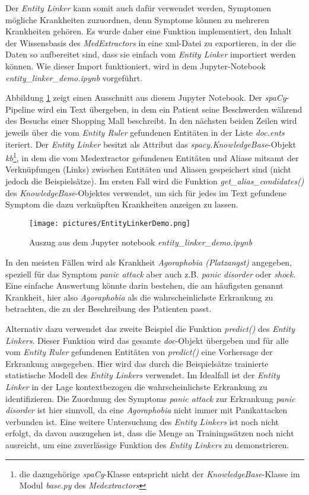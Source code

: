 Der \emph{Entity Linker} kann somit auch dafür verwendet werden, Symptomen mögliche Krankheiten zuzuordnen, denn Symptome können zu mehreren Krankheiten gehören. Es wurde daher eine Funktion implementiert, den Inhalt der Wissensbasis des \emph{MedExtractors} in eine xml-Datei zu exportieren, in der die Daten so aufbereitet sind, dass sie einfach vom \emph{Entity Linker} importiert werden können. Wie dieser Import funktioniert, wird in dem Jupyter-Notebook \emph{entity\_linker\_demo.ipynb} vorgeführt.

Abbildung \ref{fig:jupyter} zeigt einen Ausschnitt aus diesem Jupyter Notebook. Der \emph{spaCy}-Pipeline wird ein Text übergeben, in dem ein Patient seine Beschwerden während des Besuchs einer Shopping Mall beschreibt. In den nächsten beiden Zeilen wird jeweils über die vom \emph{Entity Ruler} gefundenen Entitäten in der Liste \emph{doc.ents} iteriert. Der \emph{Entity Linker} besitzt als Attribut das \emph{spacy.KnowledgeBase}-Objekt \emph{kb}\footnote{die dazugehörige \emph{spaCy}-Klasse entspricht nicht der \emph{KnowledgeBase}-Klasse im Modul \emph{base.py} des \emph{Medextractors}}, in dem die vom Medextractor gefundenen Entitäten und Aliase mitsamt der Verknüpfungen (Links) zwischen Entitäten und Aliasen gespeichert sind (nicht jedoch die Beispielsätze). Im ersten Fall wird die Funktion \emph{get\_alias\_condidates()} des \emph{KnowledgeBase}-Objektes verwendet, um sich für jedes im Text gefundene Symptom die dazu verknüpften Krankheiten anzeigen zu lassen.

\begin{figure}[h]
    \centering
    \texttt{[image: pictures/EntityLinkerDemo.png]}
    \caption{Auszug aus dem Jupyter notebook \emph{entity\_linker\_demo.ipynb}}
    \label{fig:jupyter}
\end{figure}

In den meisten Fällen wird als Krankheit \emph{Agoraphobia (Platzangst)} angegeben, speziell für das Symptom \emph{panic attack} aber auch z.B. \emph{panic disorder} oder \emph{shock}. Eine einfache Auswertung könnte darin bestehen, die am häufigsten genannt Krankheit, hier also \emph{Agoraphobia} als die wahrscheinlichste Erkrankung zu betrachten, die zu der Beschreibung des Patienten passt.

Alternativ dazu verwendet das zweite Beispiel die Funktion \emph{predict()} des \emph{Entity Linkers}. Dieser Funktion wird das gesamte \emph{doc}-Objekt übergeben und für alle vom \emph{Entity Ruler} gefundenen Entitäten von \emph{predict()} eine Vorhersage der Erkrankung ausgegeben. Hier wird das durch die Beispielsätze trainierte statistische Modell des \emph{Entity Linkers} verwendet. Im Idealfall ist der \emph{Entity Linker} in der Lage kontextbezogen die wahrscheinlichste Erkrankung zu identifizieren. Die Zuordnung des Symptoms \emph{panic attack} zur Erkrankung \emph{panic disorder} ist hier sinnvoll, da eine \emph{Agoraphobia} nicht immer mit Panikattacken verbunden ist. Eine weitere Untersuchung des \emph{Entity Linkers} ist noch nicht erfolgt, da davon auszugehen ist, dass die Menge an Trainingssätzen noch nicht ausreicht, um eine zuverlässige Funktion des \emph{Entity Linkers} zu demonstrieren.

